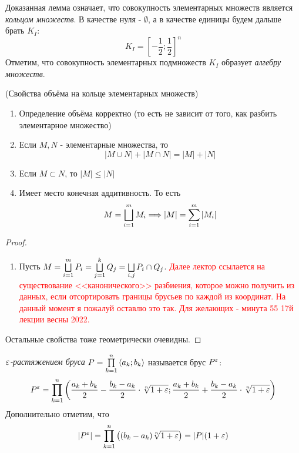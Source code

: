 \begin{note}
	Доказанная лемма означает, что совокупность элементарных множеств является \textit{кольцом множеств}. В качестве нуля - $\emptyset$, а в качестве единицы будем дальше брать $K_I$:
	\[
		K_I = \left[-\frac{1}{2}; \frac{1}{2}\right]^n
	\]
	Отметим, что совокупность элементарных подмножеств $K_I$ образует \textit{алгебру множеств}.
\end{note}

\begin{theorem} (Свойства объёма на кольце элементарных множеств)
	\begin{enumerate}
		\item Определение объёма корректно (то есть не зависит от того, как разбить элементарное множество)
		
		\item Если $M, N$ - элементарные множества, то
		\[
			|M \cup N| + |M \cap N| = |M| + |N|
		\]
		
		\item Если $M \subset N$, то $|M| \le |N|$
		
		\item Имеет место конечная аддитивность. То есть
		\[
			M = \bigsqcup\limits_{i = 1}^m M_i \Longrightarrow |M| = \sum\limits_{i = 1}^m |M_i|
		\]
	\end{enumerate}
\end{theorem}

\begin{proof}~
	\begin{enumerate}
		\item Пусть \(M = \bigsqcup\limits_{i = 1}^m P_i = \bigsqcup\limits_{j = 1}^k Q_j = \bigsqcup\limits_{i, j} P_i \cap Q_j\). \textcolor{red}{Далее лектор ссылается на существование <<канонического>> разбиения, которое можно получить из данных, если отсортировать границы брусьев по каждой из координат. На данный момент я пожалуй оставлю это так. Для желающих - минута 55 17й лекции весны 2022.}
	\end{enumerate}
	Остальные свойства тоже геометрически очевидны.
\end{proof}

\begin{definition}
	\textit{$\varepsilon$-растяжением бруса} $P = \prod\limits_{k = 1}^n \left\langle a_k; b_k\right\rangle$ называется брус $P^\varepsilon$:
	\[
		P^\varepsilon = \prod\limits_{k = 1}^n \left(\frac{a_k + b_k}{2} - \frac{b_k - a_k}{2} \cdot \sqrt[n]{1 + \varepsilon}; \frac{a_k + b_k}{2} + \frac{b_k - a_k}{2} \cdot \sqrt[n]{1 + \varepsilon}\right)
	\]
	Дополнительно отметим, что
	\[
		|P^\varepsilon| = \prod\limits_{k = 1}^n \big((b_k - a_k)\sqrt[n]{1 + \varepsilon}\big) = |P|(1 + \varepsilon)
	\]
\end{definition}

